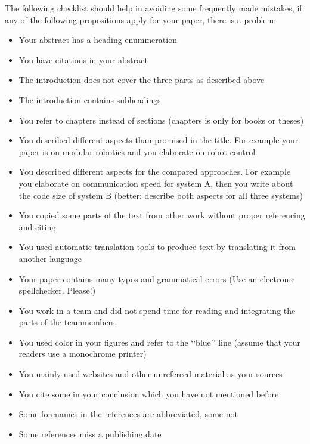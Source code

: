 \documentclass[10pt,a4paper,twoside,twocolumn]{article}
\def\lqq{\lq\lq}
\def\rqq{\rq\rq}
\def\dq#1{\lqq #1\rqq}
\begin{document}
The following checklist should help in avoiding some frequently made
mistakes, if any of the following propositions apply for your paper,
there is a problem:

\begin{itemize}

\item Your abstract has a heading enummeration

\item You have citations in your abstract

\item The introduction does not cover the three parts as described above

\item The introduction contains subheadings

\item You refer to chapters instead of sections (chapters is only for books or theses)

\item You described different aspects than promised in the title. For example your paper is on modular robotics and you elaborate on robot control.

\item You described different aspects for the compared approaches. For example you elaborate on communication speed for system A, then you write about the code size of system B (better: describe both aspects for all three systems)

\item You copied some parts of the text from other work without proper referencing and citing

\item You used automatic translation tools to produce text by translating it from another language

\item Your paper contains many typos and grammatical errors (Use an electronic spellchecker. Please!)

\item You work in a team and did not spend time for reading and integrating the parts of the teammembers.

\item You used color in your figures and refer to the \dq{blue} line (assume that your readers use a monochrome printer)

\item You mainly used websites and other unrefereed material as your sources

\item You cite some in your conclusion which you have not mentioned before

\item Some forenames in the references are abbreviated, some not

\item Some references miss a publishing date

\end{itemize}
\end{document}
